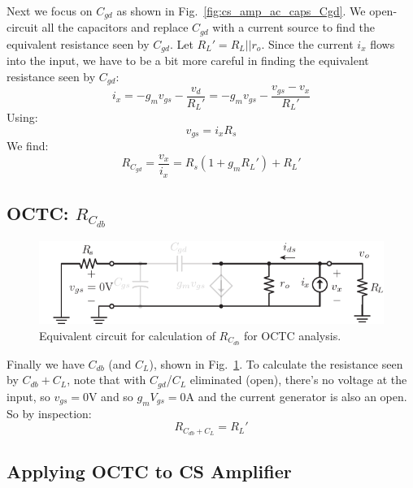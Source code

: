 Next we focus on $C_{gd}$ as shown in Fig.~\ref{fig:cs_amp_ac_caps_Cgd}.  We open-circuit all the capacitors and replace $C_{gd}$ with a current source to find the equivalent resistance seen by $C_{gd}$.  Let $R_L' = R_L || r_o$.  Since the current $i_x$ flows into the input, we have to be a bit more careful in finding the equivalent resistance seen by $C_{gd}$:
%
\begin{equation} 
	{i_x} = -{g_m}{v_{gs}} - \frac{{{v_d}}}{{R_L'}} = -{g_m}{v_{gs}} - \frac{{{v_{gs}}-{v_x} }}{{R_L'}} 
\end{equation}
%
Using:
\begin{equation} 
	{v_{gs}} =  {i_x}R_{s} 
\end{equation}
%
We find:
%
\begin{equation} 
	{R_{C_{gd}}} = \frac{{{v_x}}}{{{i_x}}} = R_{s}(1 + {g_m}R_L') + R_L' 
\end{equation}



\subsection{OCTC:  $R_{C_{db}}$}

\begin{figure}[tb]
\begin{center}
\includegraphics[scale=1]{cs_amp_ac_caps_Cdb}
\end{center}
\caption{Equivalent circuit for calculation of $R_{C_{db}}$ for OCTC analysis.} \label{fig:cs_amp_ac_caps_Cdb}
\end{figure}

Finally we have $C_{db}$ (and $C_L$), shown in Fig.~\ref{fig:cs_amp_ac_caps_Cdb}. To calculate the resistance seen by $C_{db} + C_L$, note that with $C_{gd}$/$C_L$ eliminated (open), there's no voltage at the input, so $v_{gs} = 0$V and so $g_m V_{gs} = 0$A and the current generator is also an open.  So by inspection:
%
\begin{equation}
	{R_{{C_{db}}+C_L}} = R_L'
\end{equation}
%




\subsection{Applying OCTC to CS Amplifier}


